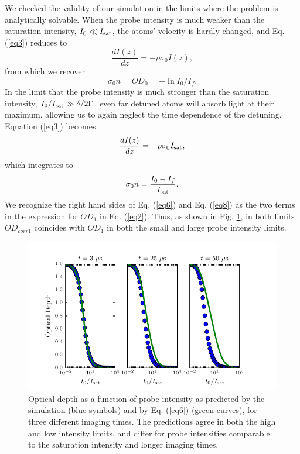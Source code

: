 \documentclass[12pt]{iopart}
\begin{document}
\par We checked the validity of our simulation in the limits where the problem is analytically solvable. When the probe intensity is much weaker than the saturation intensity, $I_0\ll I_{\rm{sat}}$, the atoms' velocity is hardly changed, and Eq.(\ref{eq3}) reduces to 
\begin{equation}
\frac{dI(z)}{dz}=-\rho\sigma_0 I(z),
\end{equation}
from which we recover 
\begin{equation}
\sigma_0 n = OD_0 = -\ln I_0/I_f. \label{eq6}
\end{equation}
In the limit that the probe intensity is much stronger than the saturation intensity, $I_0/I_{\rm{sat}}\gg \delta/2\Gamma$, even far detuned atoms will absorb light at their maximum, allowing us to again neglect the time dependence of the detuning. Equation (\ref{eq3}) becomes 
\begin{equation}
\frac{dI(z)}{dz}=-\rho\sigma_0 I_{\rm{sat}}, 
\end{equation}
which integrates to 
\begin{equation}
\sigma_0 n = \frac{I_0 - I_f}{I_{\rm{sat}}}. \label{eq8}
\end{equation}
We recognize the right hand sides of Eq. (\ref{eq6}) and Eq. (\ref{eq8}) as the two terms in the expression for $OD_1$ in Eq. (\ref{eq2}). Thus, as shown in  Fig. \ref{fig:IsatLimits}, in both limits $OD_{corr1}$  coincides with $OD_1$ in both the small and large probe intensity limits. 
\begin{figure}
	\includegraphics{figure3.pdf}
\caption{Optical depth as a function of probe intensity as predicted by the simulation (blue symbols) and by Eq. (\ref{eq6}) (green curves), for three different imaging times. The predictions agree in both the high and low intensity limits, and differ for probe intensities comparable to the saturation intensity and longer imaging times. }  
\label{fig:IsatLimits}
\end{figure}
\end{document}
